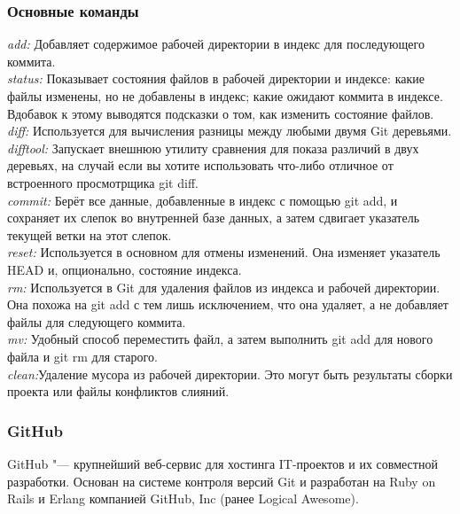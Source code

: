 \documentclass{article}
\begin{document}
		\subsubsection{Основные команды}
		\textit{add:} Добавляет содержимое рабочей директории в индекс для последующего коммита.\\
		
		\textit{status:} Показывает состояния файлов в рабочей директории и индексе: какие файлы изменены, но не добавлены в индекс; какие ожидают коммита в индексе. Вдобавок к этому выводятся подсказки о том, как изменить состояние файлов.\\
		
		\textit{diff:} Используется для вычисления разницы между любыми двумя Git деревьями.\\ 
		
		\textit{difftool:} Запускает внешнюю утилиту сравнения для показа различий в двух деревьях, на случай если вы хотите использовать что-либо отличное от встроенного просмотрщика git diff.\\
		
		\textit{commit:} Берёт все данные, добавленные в индекс с помощью git add, и сохраняет их слепок во внутренней базе данных, а затем сдвигает указатель текущей ветки на этот слепок.\\
		
		\textit{reset:} Используется в основном для отмены изменений. Она изменяет указатель HEAD и, опционально, состояние индекса.\\
		
		\textit{rm:} Используется в Git для удаления файлов из индекса и рабочей директории. Она похожа на git add с тем лишь исключением, что она удаляет, а не добавляет файлы для следующего коммита.\\
		
		\textit{mv:} Удобный способ переместить файл, а затем выполнить git add для нового файла и git rm для старого.\\
		
		\textit{clean:}Удаление мусора из рабочей директории. Это могут быть результаты сборки проекта или файлы конфликтов слияний.
		
		\subsubsection{GitHub}
		GitHub "--- крупнейший веб-сервис для хостинга IT-проектов и их совместной разработки. Основан на системе контроля версий Git и разработан на Ruby on Rails и Erlang компанией GitHub, Inc (ранее Logical Awesome).\\
		
\end{document}
